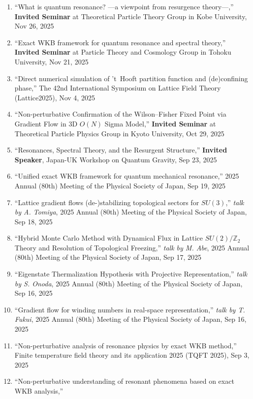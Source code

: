 \begin{enumerate}
 \item ``What is quantum resonance? ---a viewpoint from resurgence theory---,''
       \textbf{Invited Seminar} at Theoretical Particle Theory  Group in Kobe University, Nov 26, 2025
 \item ``Exact WKB framework for quantum resonance and spectral theory,''
       \textbf{Invited Seminar} at Particle Theory and Cosmology Group in Tohoku University, Nov 21, 2025
 \item ``Direct numerical simulation of 't~Hooft partition function and (de)confining phase,''
       The 42nd International Symposium on Lattice Field Theory (Lattice2025), Nov 4, 2025
 \item ``Non-perturbative Confirmation of the Wilson--Fisher Fixed Point via Gradient Flow in 3D $O(N)$ Sigma Model,''
       \textbf{Invited Seminar} at Theoretical Particle Physics Group in Kyoto University, Oct 29, 2025
 \item ``Resonances, Spectral Theory, and the Resurgent Structure,''
       \textbf{Invited Speaker},
       Japan-UK Workshop on Quantum Gravity, Sep 23, 2025
 \item ``Unified exact WKB framework for quantum mechanical resonance,''
       2025 Annual (80th) Meeting of the Physical Society of Japan, Sep 19, 2025
 \item ``Lattice gradient flows (de-)stabilizing topological sectors for $SU(3)$,''
       \textit{talk by A. Tomiya},
       2025 Annual (80th) Meeting of the Physical Society of Japan, Sep 18, 2025
 \item ``Hybrid Monte Carlo Method with Dynamical Flux in Lattice $SU(2)/\mathbb{Z}_2$ Theory and Resolution of Topological Freezing,''
       \textit{talk by M. Abe},
       2025 Annual (80th) Meeting of the Physical Society of Japan, Sep 17, 2025
 \item ``Eigenstate Thermalization Hypothesis with Projective Representation,''
       \textit{talk by S. Onoda},
       2025 Annual (80th) Meeting of the Physical Society of Japan, Sep 16, 2025
 \item ``Gradient flow for winding numbers in real-space representation,''
       \textit{talk by T. Fukui},
       2025 Annual (80th) Meeting of the Physical Society of Japan, Sep 16, 2025
 \item ``Non-perturbative analysis of resonance physics by exact WKB method,''
       Finite temperature field theory and its application 2025 (TQFT 2025), Sep 3, 2025
 \item ``Non-perturbative understanding of resonant phenomena based on exact WKB analysis,''

\end{enumerate}
